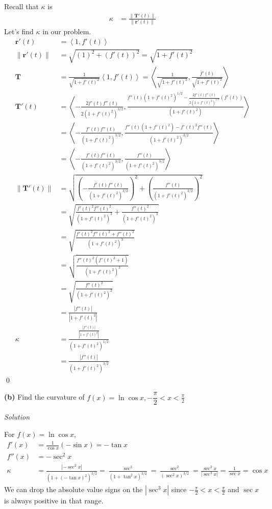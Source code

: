 \documentclass{article}
\newcommand{\lrp}[1]{\left( #1 \right)}
\newcommand{\lra}[1]{\left\langle #1 \right\rangle}
\newcommand{\T}[0]{\mathbf{T}}
\renewcommand{\r}[0]{\mathbf{r}}
\newcommand{\Solution}{\textit{Solution}}
\begin{document}
Recall that $\kappa$ is
\begin{align*}
    \kappa&=\frac{\lVert \T'(t)\rVert}{\lVert \r'(t)\rVert}
\end{align*}
Let's find $\kappa$ in our problem.
\begin{align*}
    \r'(t)&=\lra{1,f'(t)}\\
    \lVert \r'(t)\rVert&=\sqrt{(1)^2 + (f'(t))^2}=\sqrt{1+f'(t)^2}\\
    \T &=\frac{1}{\sqrt{1+f'(t)^2}}\lra{1,f'(t)}=\lra{\frac{1}{\sqrt{1+f'(t)^2}},\frac{f'(t)}{\sqrt{1+f'(t)^2}}}\\
    \T'(t)&=\lra{-\frac{2f'(t)f''(t)}{2(1+f'(t)^2)^{3/2}},\frac{f''(t)(1+f'(t)^2)^{1/2}-\frac{2f'(t)f''(t)}{2(1+f'(t)^2)^{1/2}}(f'(t))}{(1+f'(t)^2)}}\\
    &=\lra{-\frac{f'(t)f''(t)}{(1+f'(t)^2)^{3/2}},\frac{f''(t)(1+f'(t)^2)-f'(t)^2f''(t)}{(1+f'(t)^2)^{3/2}}}\\
    &=\lra{-\frac{f'(t)f''(t)}{(1+f'(t)^2)^{3/2}},\frac{f''(t)}{(1+f'(t)^2)^{3/2}}}\\
    \lVert \T'(t)\rVert&=\sqrt{\lrp{-\frac{f'(t)f''(t)}{(1+f'(t)^2)^{3/2}}}^2+\lrp{\frac{f''(t)}{(1+f'(t)^2)^{3/2}}}^2}\\
    &=\sqrt{\frac{f'(t)^2f''(t)^2}{(1+f'(t)^2)^3}+\frac{f''(t)^2}{(1+f'(t)^2)^3}}\\
    &=\sqrt{\frac{f'(t)^2f''(t)^2+f''(t)^2}{(1+f'(t)^2)^3}}\\
    &=\sqrt{\frac{f''(t)^2(f'(t)^2+1)}{(1+f'(t)^2)^3}}\\
    &=\sqrt{\frac{f''(t)^2}{(1+f'(t)^2)^2}}\\
    &=\frac{\left|f''(t)\right|}{\left|1+f'(t)^2\right|}\\
    \kappa&=\frac{\frac{\left|f''(t)\right|}{\left|1+f'(t)^2\right|}}{(1+f'(t)^2)^{1/2}}\\
    &=\frac{\left|f''(t)\right|}{(1+f'(t)^2)^{3/2}}
\end{align*}
\qed
\newpage
{}
{}\textbf{(b)} Find the curvature of $f(x)=\ln \cos x,-\dfrac{\pi}{2}<x<\frac{\pi}{2}$

\Solution

For $f(x)=\ln \cos x$,
\begin{align*}
    f'(x)&=\frac{1}{\cos x}(-\sin x)=-\tan x\\
    f''(x)&=-\sec^2 x\\
    \kappa &=\frac{\left|-\sec^2 x\right|}{(1+(-\tan x)^2)^{3/2}}=\frac{\sec ^2}{(1+\tan^2 x)^{3/2}}=\frac{\sec ^2}{(\sec ^2 x)^{3/2}}=\frac{\sec ^2 x}{\left | \sec ^3 x\right |}=\frac{1}{\sec x}=\boxed{\cos x}
\end{align*}
We can drop the absolute value signs on the $\left | \sec^3 x\right |$ since $\displaystyle-\frac{\pi}{2}<x<\frac{\pi}{2}$ and $\sec x$ is always positive in that range.
\end{document}
